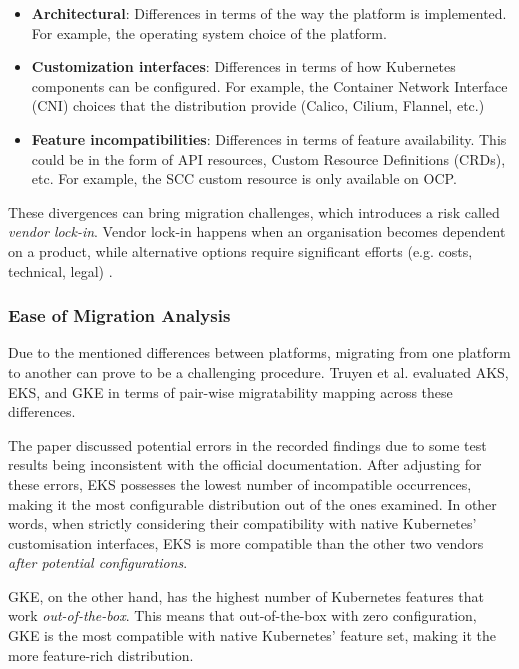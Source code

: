 \begin{itemize}

\item \textbf{Architectural}: Differences in terms of the way the platform is implemented. For example, the operating system choice of the platform.
\item \textbf{Customization interfaces}: Differences in terms of how Kubernetes components can be configured. For example, the Container Network Interface (CNI) choices that the distribution provide (Calico, Cilium, Flannel, etc.)
\item \textbf{Feature incompatibilities}: Differences in terms of feature availability. This could be in the form of API resources, Custom Resource Definitions (CRDs), etc. For example, the SCC custom resource is only available on OCP.

\end{itemize}

These divergences can bring migration challenges, which introduces a risk called \textit{vendor lock-in}. Vendor lock-in happens when an organisation becomes dependent on a product, while alternative options require significant efforts (e.g. costs, technical, legal) \cite{opara2016critical}.

\subsubsection{Ease of Migration Analysis}

Due to the mentioned differences between platforms, migrating from one platform to another can prove to be a challenging procedure. Truyen et al. \cite{cloudnativecomputingfoundationFrequentlyAskedQuestions2018} evaluated AKS, EKS, and GKE in terms of pair-wise migratability mapping across these differences. 

The paper discussed potential errors in the recorded findings due to some test results being inconsistent with the official documentation. After adjusting for these errors, EKS possesses the lowest number of incompatible occurrences, making it the most configurable distribution out of the ones examined. In other words, when strictly considering their compatibility with native Kubernetes' customisation interfaces, EKS is more compatible than the other two vendors \textit{after potential configurations}.

GKE, on the other hand, has the highest number of Kubernetes features that work \textit{out-of-the-box}. This means that out-of-the-box with zero configuration, GKE is the most compatible with native Kubernetes' feature set, making it the more feature-rich distribution.

